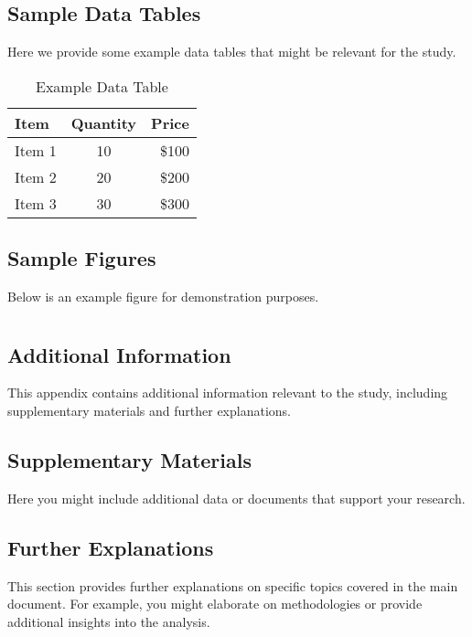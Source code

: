 \appendix %

\chapter{}
\section{Sample Data Tables}

Here we provide some example data tables that might be relevant for the study.

\begin{table}[h!]
\centering
\caption{Example Data Table}
\begin{tabular}{|l|c|r|}
\hline
\textbf{Item} & \textbf{Quantity} & \textbf{Price} \\
\hline
Item 1 & 10 & \$100 \\
Item 2 & 20 & \$200 \\
Item 3 & 30 & \$300 \\
\hline
\end{tabular}
\end{table}

\section{Sample Figures}

Below is an example figure for demonstration purposes.



\chapter{}
\section{Additional Information}

This appendix contains additional information relevant to the study, including supplementary materials and further explanations.

\section{Supplementary Materials}

Here you might include additional data or documents that support your research.

\section{Further Explanations}

This section provides further explanations on specific topics covered in the main document. For example, you might elaborate on methodologies or provide additional insights into the analysis.


